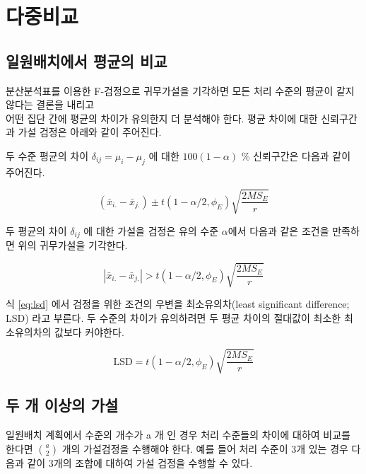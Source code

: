 \documentclass[
  10pt,
]{book}
\theoremstyle{definition}
\theoremstyle{definition}
\theoremstyle{definition}
\theoremstyle{definition}
\theoremstyle{remark}
\begin{document}
\hypertarget{uxb2e4uxc911uxbe44uxad50}{%
\section{다중비교}\label{uxb2e4uxc911uxbe44uxad50}}

\hypertarget{uxc77cuxc6d0uxbc30uxce58uxc5d0uxc11c-uxd3c9uxade0uxc758-uxbe44uxad50}{%
\subsection{일원배치에서 평균의 비교}\label{uxc77cuxc6d0uxbc30uxce58uxc5d0uxc11c-uxd3c9uxade0uxc758-uxbe44uxad50}}

분산분석표를 이용한 F-검정으로 귀무가설을 기각하면 모든 처리 수준의
평균이 같지 않다는 결론을 내리고\\
어떤 집단 간에 평균의 차이가 유의한지 더 분석해야 한다. 평균 차이에 대한
신뢰구간과 가설 검정은 아래와 같이 주어진다.

두 수준 평균의 차이 \(\delta_{ij} = \mu_i - \mu_j\) 에 대한
\(100(1-\alpha)\) \% 신뢰구간은 다음과 같이 주어진다.

\begin{equation}
( \bar {x}_{i.} - \bar {x}_{j.})   \pm t(1-\alpha/2, \phi_E) \sqrt{ \frac{2MS_E}{r}} 
\label{eq:twomeanci}
\end{equation}

두 평균의 차이 \(\delta_{ij}\) 에 대한 가설을 검정은 유의 수준
\(\alpha\)에서 다음과 같은 조건을 만족하면 위의 귀무가설을 기각한다.

\begin{equation}
 \left | \bar {x}_{i.} - \bar {x}_{j.} \right | > t(1-\alpha/2, \phi_E) \sqrt{ \frac{2MS_E}{r}} 
\label{eq:lsd}
\end{equation}

식 \eqref{eq:lsd} 에서 검정을 위한 조건의 우변을 최소유의차(least
significant difference; LSD) 라고 부른다. 두 수준의 차이가 유의하려면 두
평균 차이의 절대값이 최소한 최소유의차의 값보다 커야한다.

\[  \text{LSD} =t(1-\alpha/2, \phi_E) \sqrt{ \frac{2MS_E}{r}}  \]

\hypertarget{uxb450-uxac1c-uxc774uxc0c1uxc758-uxac00uxc124}{%
\subsection{두 개 이상의 가설}\label{uxb450-uxac1c-uxc774uxc0c1uxc758-uxac00uxc124}}

일원배치 계획에서 수준의 개수가 a 개 인 경우 처리 수준들의 차이에 대하여
비교를 한다면 \(a \choose 2\) 개의 가설검정을 수행해야 한다. 예를 들어
처리 수준이 3개 있는 경우 다음과 같이 3개의 조합에 대하여 가설 검정을
수행할 수 있다.
\end{document}
